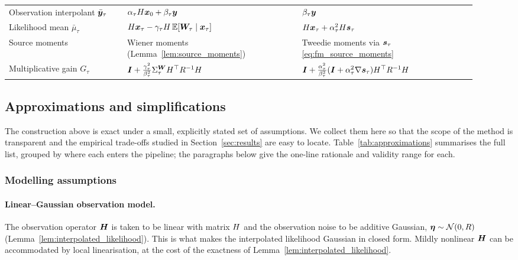\begin{table}[ht]
\begin{tabular}{p{0.235\linewidth}|p{0.345\linewidth}|p{0.345\linewidth}}
        Observation interpolant $\bar{\boldsymbol{y}}_\tau$
            & $\alpha_\tau H\boldsymbol{x}_0 + \beta_\tau\boldsymbol{y}$
            & $\beta_\tau\boldsymbol{y}$ \\
        Likelihood mean $\bar\mu_\tau$
            & $H\boldsymbol{x}_\tau-\gamma_\tau H\,\mathbb{E}[\boldsymbol{W}_\tau\mid\boldsymbol{x}_\tau]$
            & $H\boldsymbol{x}_\tau+\alpha_\tau^2H\bm{s}_\tau$ \\
        Source moments
            & Wiener moments (Lemma~\ref{lem:source_moments})
            & Tweedie moments via $\bm{s}_\tau$ \eqref{eq:fm_source_moments} \\
        Multiplicative gain $G_\tau$
            & $\bm{I}+\frac{\gamma_\tau^2}{\beta_\tau^2}\Sigma^{\boldsymbol{W}}_\tau H^\top R^{-1}H$
            & $\bm{I}+\frac{\alpha_\tau^2}{\beta_\tau^2}(\bm{I}+\alpha_\tau^2\nabla\bm{s}_\tau)H^\top R^{-1}H$ \\
        \bottomrule
    \end{tabular}
\end{table}

\subsection{Approximations and simplifications}
\label{subsec:approximations}

The construction above is exact under a small, explicitly stated set of
assumptions. We collect them here so that the scope of the method is transparent
and the empirical trade-offs studied in Section~\ref{sec:results} are easy to
locate. Table~\ref{tab:approximations} summarises the full list, grouped by
where each enters the pipeline; the paragraphs below give the one-line rationale
and validity range for each.

\subsubsection{Modelling assumptions}

\paragraph{Linear--Gaussian observation model.}
The observation operator $\boldsymbol{H}$ is taken to be linear with matrix
$H$ and the observation noise to be additive Gaussian,
$\boldsymbol{\eta}\sim\mathcal{N}(0,R)$ (Lemma~\ref{lem:interpolated_likelihood}).
This is what makes the interpolated likelihood Gaussian in closed form. Mildly
nonlinear $\boldsymbol{H}$ can be accommodated by local linearisation, at the cost
of the exactness of Lemma~\ref{lem:interpolated_likelihood}.

